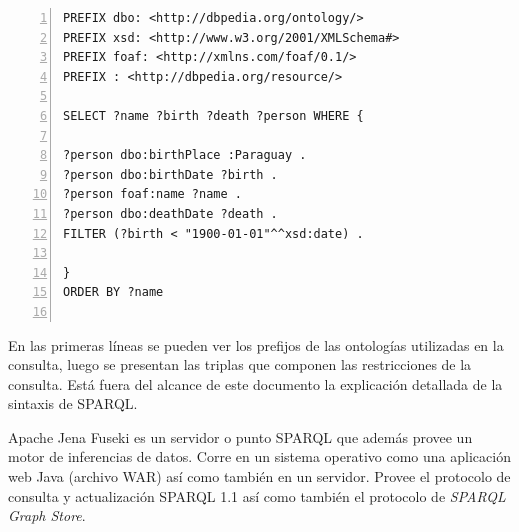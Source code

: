 \lstset{
    language=SPARQL
}
\noindent\begin{minipage}{\textwidth}
\begin{lstlisting}[captionpos=b, caption=Ejemplo de consulta SPARQL, label=lst:consulta-sparql,  numbers=left,  numberstyle=\tiny\color{mygray},
    basicstyle=\tiny,frame=single]
PREFIX dbo: <http://dbpedia.org/ontology/>
PREFIX xsd: <http://www.w3.org/2001/XMLSchema#>
PREFIX foaf: <http://xmlns.com/foaf/0.1/>
PREFIX : <http://dbpedia.org/resource/>

SELECT ?name ?birth ?death ?person WHERE { 

?person dbo:birthPlace :Paraguay . 
?person dbo:birthDate ?birth . 
?person foaf:name ?name . 
?person dbo:deathDate ?death . 
FILTER (?birth < "1900-01-01"^^xsd:date) . 

}
ORDER BY ?name
 
\end{lstlisting}
\end{minipage}

En las primeras líneas se pueden ver los prefijos de las ontologías utilizadas en la consulta, luego se presentan las triplas que componen las restricciones de la consulta. Está fuera del alcance de este documento la explicación detallada de la sintaxis de SPARQL.

Apache Jena Fuseki es un servidor o punto SPARQL que además provee un motor de inferencias de datos. Corre en un sistema operativo como una aplicación web Java (archivo WAR) así como también en un servidor. Provee el protocolo de consulta y actualización SPARQL 1.1 así como también el protocolo de\textit{ SPARQL Graph Store}.
